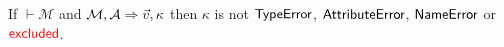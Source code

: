 \begin{theorem}
\label{thm:type-soundness}
If $\vdash \mathcal{M}$ and $\mathcal{M}, \mathcal{A} \Rightarrow \seq{v}, \kappa$ then
$\kappa$ is not $\mathsf{TypeError}$, $\mathsf{AttributeError}$, $\mathsf{NameError}$ or $\textcolor{red}{\mathsf{excluded}}$.
\end{theorem}

